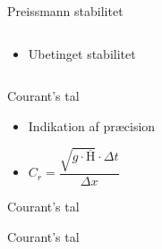\begin{frame}{Preissmann stabilitet}{}
\vfill\vfill\centering
	\begin{columns}
		\begin{column}{0.25\textwidth}
		\vspace{20mm}
			\begin{itemize}
				\item Ubetinget stabilitet
			\end{itemize}
		\end{column}

		\begin{column}{0.7\textwidth}
			\begin{figure}[H]
	  			
			\end{figure}
		\end{column}
	\end{columns}			
\vfill\vfill		
\end{frame}



\begin{frame}{Courant's tal}{}
\vfill\vfill\centering

\begin{itemize}
	\item Indikation af præcision  
	\vspace{3mm}
	\item $C_r =  \dfrac{\sqrt{g \cdot \overline{\text{H}}} \cdot \Delta t}{\Delta x}$ 
\end{itemize}

\vfill\vfill		
\end{frame}

\begin{frame}{Courant's tal}{}
\vfill\vfill\centering
\begin{figure}[H]
  
\end{figure}
\vfill\vfill		
\end{frame}

\begin{frame}{Courant's tal}{}
\vfill\vfill\centering
\begin{figure}[H]
  
\end{figure}
\vfill\vfill		
\end{frame}



